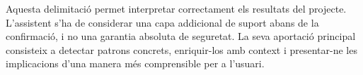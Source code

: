 Aquesta delimitació permet interpretar correctament els resultats del projecte. L’assistent s’ha de considerar una capa addicional de suport abans de la confirmació, i no una garantia absoluta de seguretat. La seva aportació principal consisteix a detectar patrons concrets, enriquir-los amb context i presentar-ne les implicacions d’una manera més comprensible per a l’usuari.
